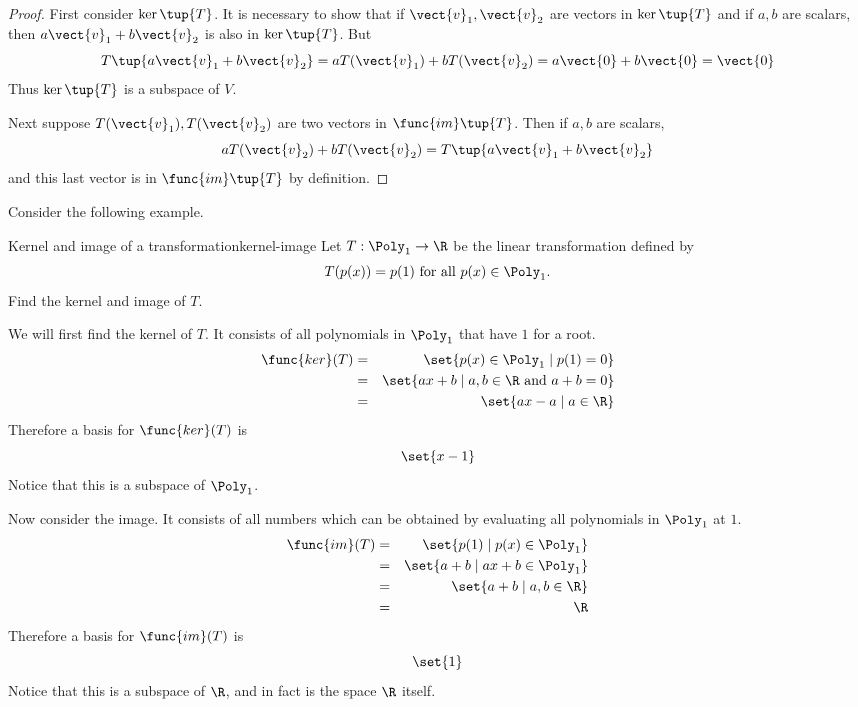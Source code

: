 \begin{proof}
First consider $\ker \tup{T}$. It is necessary to
show that if $\vect{v}_{1},\vect{v}_{2}$ are vectors in $\ker \tup{T} $
and if $a,b$ are scalars, then $a\vect{v}_{1}+b\vect{v}_{2}$ is also in $\ker
\tup{T}$. But 
\begin{equation*}
T\tup{a\vect{v}_{1}+b\vect{v}_{2}} =aT(\vect{v}_{1})+bT(\vect{v}_{2})=a\vect{0}+b\vect{0}=\vect{0}
\end{equation*}
Thus $\ker \tup{T} $ is a subspace of $V$.

Next suppose $T(\vect{v}_{1}),T(\vect{v}_{2})$ are two vectors in $\func{im}\tup{
T}$. Then if $a,b$ are scalars, 
\begin{equation*}
aT(\vect{v}_{2})+bT(\vect{v}_{2})=T\tup{a\vect{v}_{1}+b\vect{v}_{2}}
\end{equation*}
and this last vector is in $\func{im}\tup{T} $ by definition. 
\end{proof}

Consider the following example.

\begin{example}{Kernel and image of a transformation}{kernel-image}
Let $T:\Poly_1\to\R$ be the linear transformation defined by
\[ T(p(x))=p(1)\mbox{ for all } p(x)\in \Poly_1.\]
Find the kernel and image of $T$.
\end{example}

\begin{solution}
We will first find the kernel of $T$. It consists of all polynomials in $\Poly_1$ that have $1$ for a root. 
\begin{eqnarray*}
\func{ker}(T) & = & \set{p(x)\in \Poly_1 \mid p(1)=0} \\
& = & \set{ax+b \mid a,b\in\R \mbox{ and }a+b=0} \\
& = & \set{ax-a \mid a\in\R}
\end{eqnarray*}
Therefore a basis for $\func{ker}(T)$ is 
\[
\set{x-1 }
\]
Notice that this is a subspace of $\Poly_1$. 

Now consider the image. It consists of all numbers which can be obtained by evaluating all polynomials in $\Poly_1$ at $1$. 
\begin{eqnarray*}
\func{im}(T) & = & \set{p(1) \mid p(x)\in \Poly_1} \\
 & = & \set{a+b \mid ax+b\in \Poly_1} \\
 & = & \set{a+b \mid a,b\in\R}\\
 & = & \R
\end{eqnarray*}
Therefore a basis for $\func{im}(T)$ is 
\[
\set{1 }
\]
Notice that this is a subspace of $\R$, and in fact is the space $\R$ itself. 
\end{solution}

